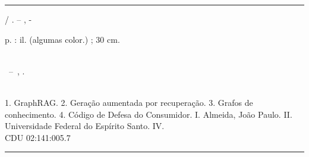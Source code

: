 \documentclass[
	12pt,				%
	openright,			%
	oneside,			%
	a4paper,			%
	english,			%
	french,				%
	spanish,			%
	brazil				%
	]{abntex2}
\begin{document}
\begin{fichacatalografica}
	\vspace*{\fill}
	\hrule
	\begin{center}
	\begin{minipage}[c]{12.5cm}
	
	\imprimirautor
	
	\hspace{0.5cm} \imprimirtitulo  / \imprimirautor. --
	\imprimirlocal, \imprimirdata-
	
	\hspace{0.5cm} \pageref{LastPage} p. : il. (algumas color.) ; 30 cm.\\
	
	\hspace{0.5cm} \imprimirorientadorRotulo~\imprimirorientador\\
	
	\hspace{0.5cm}
	\parbox[t]{\textwidth}{\imprimirtipotrabalho~--~\imprimirinstituicao,
	\imprimirdata.}\\
	
	\hspace{0.5cm}
		1. GraphRAG.
		2. Geração aumentada por recuperação.
		3. Grafos de conhecimento.
		4. Código de Defesa do Consumidor.
		I. Almeida, João Paulo.
		II. Universidade Federal do Espírito Santo.
		IV. \imprimirtitulo \\ 			
	
	\hspace{8.75cm} CDU 02:141:005.7\\
	
	\end{minipage}
	\end{center}
	\hrule
\end{fichacatalografica}



% 
\end{document}
